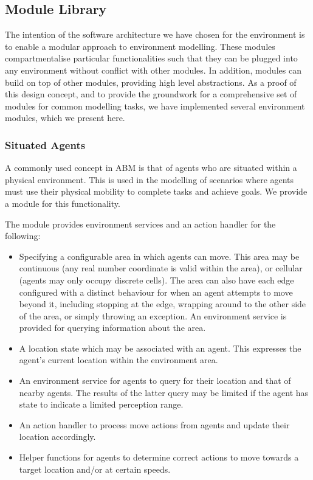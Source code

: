 \subsection{Module Library}

The intention of the software architecture we have chosen for the environment is
to enable a modular approach to environment modelling. These modules
compartmentalise particular functionalities such that they can be plugged into
any environment without conflict with other modules. In addition, modules
can build on top of other modules, providing high level abstractions. As a proof
of this design concept, and to provide the groundwork for a comprehensive set of
modules for common modelling tasks, we have implemented several environment
modules, which we present here.

\subsubsection*{Situated Agents}

A commonly used concept in \ac{ABM} is that of agents who are situated within a
physical environment. This is used in the modelling of scenarios where agents
must use their physical mobility to complete tasks and achieve goals. We provide
a module for this functionality.

The module provides environment services and an action handler for the
following:
\begin{itemize}
	\item Specifying a configurable area in which agents can move. This area may be
	continuous (any real number coordinate is valid within the area), or cellular 
	(agents may only occupy discrete cells). The area can also have each edge
	configured with a distinct behaviour for when an agent attempts to move beyond it,
	including stopping at the edge, wrapping around to the other side of the area,
	or simply throwing an exception. An environment service is provided for 
	querying information about the area.
	\item A location state which may be associated with an agent. This expresses
	the agent's current location within the environment area.
	\item An environment service for agents to query for their location and that of
	nearby agents. The results of the latter query may be limited if the agent has
	state to indicate a limited perception range.
	\item An action handler to process move actions from agents and update their
	location accordingly.
	\item Helper functions for agents to determine correct actions to move towards
	a target location and/or at certain speeds.
\end{itemize}

